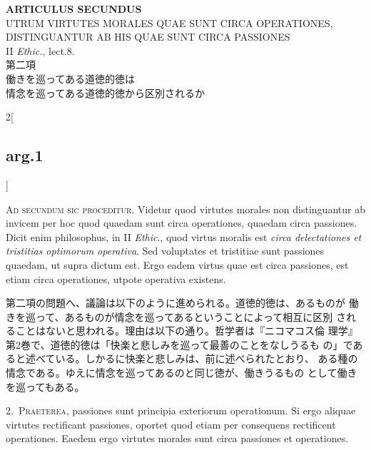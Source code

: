 \documentclass[paper=a4paper,fontsize=10pt,jafontsize=9pt,titlepage]{jlreq}
\begin{document}
\begin{center}
{\Large {\bfseries ARTICULUS SECUNDUS}}\\
{\large UTRUM VIRTUTES MORALES QUAE SUNT CIRCA OPERATIONES,\\DISTINGUANTUR AB HIS QUAE SUNT CIRCA PASSIONES}\\
{\footnotesize II {\itshape Ethic.}, lect.8.}\\
{\Large 第二項\\働きを巡ってある道徳的徳は\\情念を巡ってある道徳的徳から区別されるか}
\end{center}

\begin{paracol}{2}[\subsection{arg.1}]

{\scshape Ad secundum sic proceditur}. Videtur quod virtutes morales
 non distinguantur ab invicem per hoc quod quaedam sunt circa
 operationes, quaedam circa passiones. Dicit enim philosophus, in II
 {\itshape Ethic}., quod virtus moralis est {\itshape circa
 delectationes et tristitias optimorum operativa}. Sed voluptates et
 tristitiae sunt passiones quaedam, ut supra dictum est. Ergo eadem
 virtus quae est circa passiones, est etiam circa operationes, utpote
 operativa existens.

\switchcolumn

第二項の問題へ、議論は以下のように進められる。道徳的徳は、あるものが
 働きを巡って、あるものが情念を巡ってあるということによって相互に区別
 されることはないと思われる。理由は以下の通り。哲学者は『ニコマコス倫
 理学』第2巻で、道徳的徳は「快楽と悲しみを巡って最善のことをなしうるも
 の」であると述べている。しかるに快楽と悲しみは、前に述べられたとおり、
 ある種の情念である。ゆえに情念を巡ってあるのと同じ徳が、働きうるもの
 として働きを巡ってもある。


2.~{\scshape Praeterea}, passiones sunt principia exteriorum
operationum. Si ergo aliquae virtutes rectificant passiones, oportet
quod etiam per consequens rectificent operationes. Eaedem ergo
virtutes morales sunt circa passiones et operationes.

\switchcolumn


\end{paracol}
\end{document}
